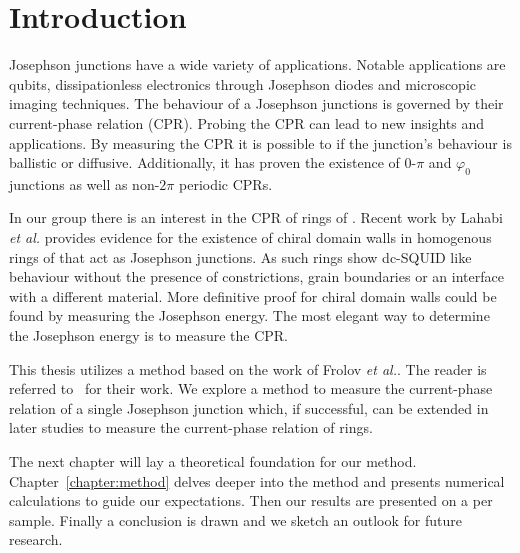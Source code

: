 \chapter{Introduction}
Josephson junctions have a wide variety of applications. Notable applications are qubits\cite{placeNewMaterialPlatform2021,pechenezhskiySuperconductingQuasichargeQubit2020}, dissipationless electronics through Josephson diodes\cite{zhangReconfigurableMagneticfieldfreeSuperconducting2023a,ciacciaGateTunableJosephson2023} and microscopic imaging techniques\cite{clarkeSQUIDHandbook2004,rogSQUIDontipMagneticMicroscopy2022,pranceSensitivityDCSQUID2023}. The behaviour of a Josephson junctions is governed by their current-phase relation (CPR). Probing the CPR can lead to new insights and applications. By measuring the CPR it is possible to if the junction's behaviour is ballistic or diffusive\cite{endresCurrentPhaseRelation2023,kayyalhaHighlySkewedCurrent2020}. Additionally, it has proven the existence of $0$-$\pi$ and $\varphi_0$ junctions\cite{frolovMeasurementCurrentPhaseRelation2004,muraniBallisticEdgeStates2017,strambiniJosephsonPhaseBattery2020,szombatiJosephsonPh0junctionNanowire2016} as well as non-$2\pi$ periodic CPRs\cite{endresCurrentPhaseRelation2023}.

In our group there is an interest in the CPR of rings of . Recent work by Lahabi \textit{et al.} provides evidence for the existence of chiral domain walls in homogenous rings of \cite{lahabiSpintripletSupercurrentsOdd2018} that act as Josephson junctions. As such  rings show dc-SQUID like behaviour without the presence of constrictions, grain boundaries or an interface with a different material. More definitive proof for chiral domain walls could be found by measuring the Josephson energy\cite{lahabiSpintripletSupercurrentsOdd2018,sigristRoleDomainWalls1999}. The most elegant way to determine the Josephson energy is to measure the CPR.

This thesis utilizes a method based on the work of Frolov \textit{et al.}. The reader is referred to~\cite{frolovMeasurementCurrentPhaseRelation2004,frolovCurrentphaseRelationsJosephson2005} for their work. We explore a method to measure the current-phase relation of a single Josephson junction which, if successful, can be extended in later studies to measure the current-phase relation of  rings.

The next chapter will lay a theoretical foundation for our method. Chapter~\ref{chapter:method} delves deeper into the method and presents numerical calculations to guide our expectations. Then our results are presented on a per sample. Finally a conclusion is drawn and we sketch an outlook for future research.